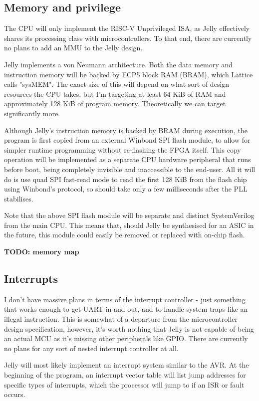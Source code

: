 \documentclass{article}
\begin{document}
\subsection{Memory and privilege}
The CPU will only implement the RISC-V Unprivileged ISA, as Jelly effectively shares its processing class
with microcontrollers. To that end, there are currently no plans to add an MMU to the Jelly design.

Jelly implements a von Neumann architecture. Both the data memory and instruction memory will be backed by
ECP5 block RAM (BRAM), which Lattice calls "sysMEM". The exact size of this will depend on what sort of
design resources the CPU takes, but I'm targeting at least 64 KiB of RAM and approximately 128 KiB of program
memory. Theoretically we can target significantly more.

Although Jelly's instruction memory is backed by BRAM during execution, the program is first copied from an
external Winbond SPI flash module, to allow for simpler runtime programming without re-flashing the FPGA
itself. This copy operation will be implemented as a separate CPU hardware peripheral that runs before boot,
being completely invisible and inaccessible to the end-user. All it will do is use quad SPI fast-read mode to
read the first 128 KiB from the flash chip using Winbond's protocol, so should take only a few milliseconds
after the PLL stabilises.

Note that the above SPI flash module will be separate and distinct SystemVerilog from the main CPU. This
means that, should Jelly be synthesised for an ASIC in the future, this module could easily be removed or
replaced with on-chip flash.

\textbf{TODO: memory map}

\subsection{Interrupts}
I don't have massive plans in terms of the interrupt controller - just something that works enough to get
UART in and out, and to handle system traps like an illegal instruction. This is somewhat of a departure from
the microcontroller design specification, however, it's worth nothing that Jelly is not capable of being an
actual MCU as it's missing other peripherals like GPIO. There are currently no plans for any sort of nested
interrupt controller at all.

Jelly will most likely implement an interrupt system similar to the AVR. At the beginning of the program, an
interrupt vector table will list jump addresses for specific types of interrupts, which the processor will
jump to if an ISR or fault occurs.
\end{document}
